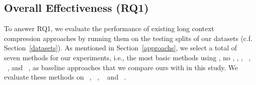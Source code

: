 
    
    


\subsection{Overall Effectiveness (RQ1)}
\label{rq1}
To answer RQ1, we evaluate the performance of existing long context compression approaches by running them on the testing splits of
our datasets (c.f. Section~\ref{datasets}). As mentioned in Section~\ref{approachs},
we select a total of seven methods for our experiments, i.e., the most basic methods using \nocontext, no \nocompression, \rag, \ragfunction,  \llmlingua~\cite{jiang2023llmlingua}, \longllmlingua~\cite{jiang2023longllmlingua}, and \llmlinguatwo~\cite{pan2024llmlingua}, as baseline approaches that we compare ours with in this study.
%
We evaluate these methods on \codellama~\cite{rozière2024codellamaopenfoundation}, \deepseekseven~\cite{guo2024deepseekcoder}, \qwenseven~\cite{hui2024qwen25codertechnicalreport} and \seed~\cite{zhang2025seed}. 

